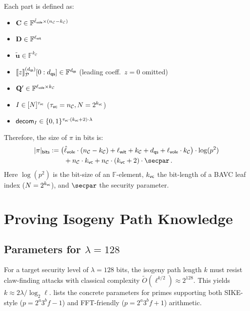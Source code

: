 \documentclass[11pt,a4paper]{article}
\theoremstyle{definition}
\theoremstyle{remark}
\newcommand{\F}{\mathbb{F}}
\newcommand{\calC}{\mathcal{C}}
\newcommand{\itmacP}[1]{\llbracket {#1} \rrbracket_{\calP}}
\newcommand{\calP}{\mathcal{P}}
\newcommand{\mat}[1]{\mathbf{#1}}
\renewcommand{\vec}[1]{\mathbf{#1}}
\begin{document}
Each part is defined as:
\begin{itemize}
	\item $\mat{C} \in \F^{\hat{\ell}_{\sf vole} \times (n_{\calC} - k_{\calC})}$
	\item $\mat{D} \in \F^{\ell_{\sf wit}}$
	\item $\tilde{\vec{u}} \in \F^{k_{\calC}}$
	\item $\itmacP{z}^{(d_{\sf qs})}[0:d_{\sf qs}] \in \F^{d_{\sf qs}}$ (leading coeff.\ $z = 0$ omitted)
	\item $\mat{Q}' \in \F^{\ell_{\sf vole} \times k_{\calC}}$
	\item $I \in [N]^{\tau_{\sf vc}}$ ($\tau_{\sf vc} = n_{\calC}, N = 2^{k_{\sf vc}}$)
	\item $\mathsf{decom}_{I} \in \{ 0, 1 \}^{\tau_{\sf vc} \cdot (k_{\sf vc} + 2) \cdot \lambda}$
\end{itemize}

Therefore, the size of $\pi$ in bits is:
\begin{equation}\label{eq:proof-size}
	\begin{aligned}
		|\pi|_{\sf bits} :=
		\bigl(
			&\hat{\ell}_{\sf vole} \cdot (n_{\calC} - k_{\calC})
			+ \ell_{\sf wit}
			+ k_{\calC}
			+ d_{\sf qs}
			+ \ell_{\sf vole} \cdot k_{\calC}
		\bigr) \cdot \log(p^2) \\
		&+ n_{\calC} \cdot k_{\sf vc}
		+ n_{\calC} \cdot (k_{\sf vc} + 2) \cdot \secpar \,.
	\end{aligned}
\end{equation}
Here $\log(p^2)$ is the bit-size of an $\F$-element,
$k_{\sf vc}$ the bit-length of a BAVC leaf index ($N = 2^{k_{\sf vc}}$),
and $\secpar$ the security parameter.

\section{Proving Isogeny Path Knowledge}
\label{sec:isogeny-proof}

\subsection{Parameters for $\lambda = 128$}

For a target security level of $\lambda = 128$ bits, the isogeny path length $k$
must resist claw-finding attacks with classical complexity $\tilde{O}(\ell^{k/2})
\approx 2^{128}$. This yields $k \approx 2\lambda / \log_2 \ell$.
 lists the concrete parameters for primes
supporting both SIKE-style ($p = 2^a 3^b f - 1$) and FFT-friendly
($p = 2^a 3^b f + 1$) arithmetic.
\end{document}
